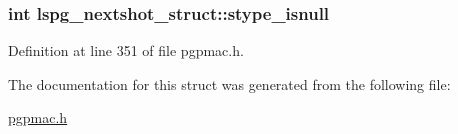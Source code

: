 \hypertarget{structlspg__nextshot__struct_a79f48c452a4aca8506bae22f897c7441}{
\subsubsection[{stype\-\_\-isnull}]{\setlength{\rightskip}{0pt plus 5cm}int lspg\-\_\-nextshot\-\_\-struct\-::stype\-\_\-isnull}}\label{structlspg__nextshot__struct_a79f48c452a4aca8506bae22f897c7441}


Definition at line 351 of file pgpmac.\-h.



The documentation for this struct was generated from the following file\-:\begin{DoxyCompactItemize}
\item 
\hyperlink{pgpmac_8h}{pgpmac.\-h}\end{DoxyCompactItemize}
